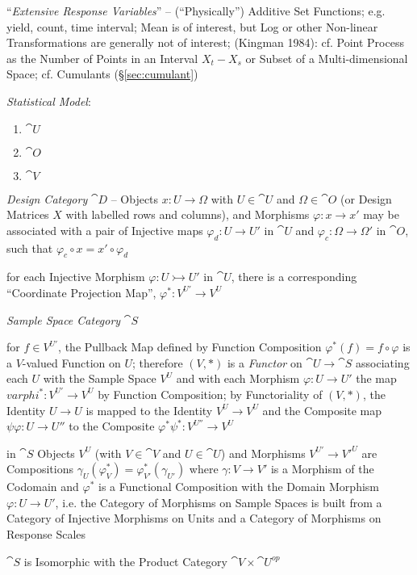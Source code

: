 ``\emph{Extensive Response Variables}'' -- (``Physically'') Additive Set
Functions; e.g. yield, count, time interval; Mean is of interest, but Log
or other Non-linear Transformations are generally not of interest;
(Kingman 1984): cf. Point Process as the Number of Points in an Interval
$X_t - X_s$ or Subset of a Multi-dimensional Space; cf. Cumulants
(\S\ref{sec:cumulant})

\emph{Statistical Model}:
\begin{enumerate}
  \item $\cat{U}$
  \item $\cat{O}$
  \item $\cat{V}$
\end{enumerate}

\emph{Design Category} $\cat{D}$ -- Objects $x : U \to \Omega$ with
$U \in \cat{U}$ and $\Omega \in \cat{O}$ (or Design Matrices $X$ with labelled
rows and columns), and Morphisms $\varphi : x \to x'$ may be associated with a
pair of Injective maps $\varphi_d : U \to U'$ in $\cat{U}$ and
$\varphi_c : \Omega \to \Omega'$ in $\cat{O}$, such that
$\varphi_c \circ x = x' \circ \varphi_d$

for each Injective Morphism $\varphi : U \rightarrowtail U'$ in $\cat{U}$, there
is a corresponding ``Coordinate Projection Map'', $\varphi^* : V^{U'} \to V^{U}$

\emph{Sample Space Category} $\cat{S}$

for $f \in V^{U'}$, the Pullback Map defined by Function Composition
$\varphi^* (f) = f \circ \varphi$ is a $V$-valued Function on $U$; therefore
$(V, *)$ is a \emph{Functor} on $\cat{U} \to \cat{S}$ associating each $U$ with
the Sample Space $V^U$ and with each Morphism $\varphi : U \to U'$ the map
$varphi^* : V^{U'} \to V^U$ by Function Composition; by Functoriality of
$(V, *)$, the Identity $U \to U$ is mapped to the Identity $V^U \to V^U$ and the
Composite map $\psi\varphi : U \to U''$ to the Composite
$\varphi^*\psi^* : V^{U''} \to V^U$

in $\cat{S}$ Objects $V^U$ (with $V \in \cat{V}$
and $U \in \cat{U}$) and Morphisms $V^{U'} \to V'^{U}$ are Compositions
$\gamma_U(\varphi_V^*) = \varphi_{V'}^*(\gamma_{U'})$ where $\gamma : V \to V'$
is a Morphism of the Codomain and $\varphi^*$ is a  Functional Composition with
the Domain Morphism $\varphi : U \to U'$, i.e. the Category of Morphisms on
Sample Spaces is built from a Category of Injective Morphisms on Units and a
Category of Morphisms on Response Scales

$\cat{S}$ is Isomorphic with the Product Category $\cat{V} \times \cat{U}^{op}$

